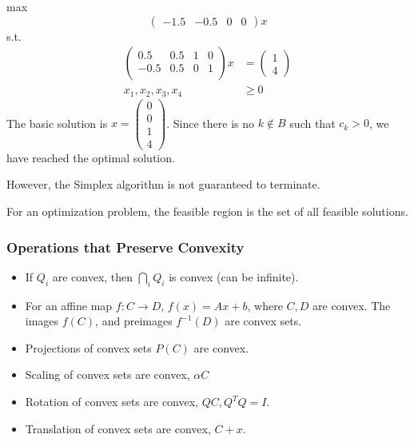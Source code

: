 \begin{definition}
        max $$\begin{pmatrix}
                -1.5 & -0.5 & 0 & 0
            \end{pmatrix}x$$
        s.t.
        \begin{align*}
            \begin{pmatrix}
                0.5  & 0.5 & 1 & 0 \\
                -0.5 & 0.5 & 0 & 1 \\
            \end{pmatrix} x & = \begin{pmatrix}
                                    1 \\ 4
                                \end{pmatrix} \\
            x_1,x_2,x_3,x_4       & \geq 0
        \end{align*}
        The basic solution is $x = \begin{pmatrix}
                0 \\ 0 \\ 1 \\ 4
            \end{pmatrix}$.
        Since there is no $k \not \in B$ such that $c_k > 0$, we have reached the optimal solution.
    
        However, the Simplex algorithm is not guaranteed to terminate.
    \end{definition}
    \begin{definition}
        For an optimization problem, the feasible region is the set of all feasible solutions.
    \end{definition}
\subsubsection{Operations that Preserve Convexity}
\begin{itemize}
    \item If $Q_i$ are convex, then $\bigcap_i Q_i$ is convex (can be infinite).
    \item For an affine map $f: C \to D$, $f(x) = Ax + b$, where $C, D$ are convex. The images $f(C)$, and preimages $f^{-1}(D)$ are convex sets.
    \item Projections of convex sets $P(C)$ are convex.
    \item Scaling of convex sets are convex, $\alpha C$
    \item Rotation of convex sets are convex, $QC, Q^TQ = I$.
    \item Translation of convex sets are convex, $C + x$.
\end{itemize}
